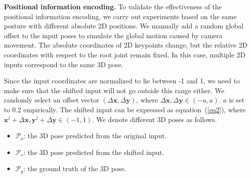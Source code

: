 \documentclass[sigconf]{acmart}
\begin{document}
\textbf{Positional information encoding.} To validate the effectiveness of the positional information encoding, we carry out experiments based on the same posture with different absolute 2D positions. We manually add a random global offset to the input poses to simulate the global motion caused by camera movement. The absolute coordinates of 2D keypoints change, but the relative 2D coordinates with respect to the root joint remain fixed. In this case, multiple 2D inputs correspond to the same 3D pose. 

Since the input coordinates are normalized to lie between -1 and 1, we need to make sure that the shifted input will not go outside this range either. We randomly select an offset vector $(\Delta\mathbf{x},\Delta\mathbf{y})$, where $\Delta\mathbf{x},\Delta\mathbf{y} \in (-a,a)$. $a$ is set to 0.2 empirically. The shifted input can be expressed as equation~(\ref{eq2}), where $\mathbf{x}^{j}+\Delta\mathbf{x},\mathbf{y}^{j}+\Delta\mathbf{y} \in (-1,1)$. We denote different 3D poses as follows.
\begin{itemize}
 \item $\mathcal{P}_{o}$: the 3D pose predicted from the original input.
 \item $\mathcal{P}_{s}$: the 3D pose predicted from the shifted input.
 \item $\mathcal{P}_{g}$: the ground truth of the 3D pose.

\end{itemize}
\end{document}
